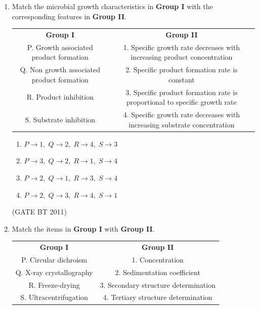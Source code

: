 \documentclass[journal,12pt,onecolumn]{IEEEtran}
\begin{document}
\begin{enumerate}
  \item Match the microbial growth characteristics in \textbf{Group I} 
  with the corresponding features in \textbf{Group II}. 

  \begin{table}[H]
  \centering
\begin{tabular}{cc}
    \textbf{Group I}  & \textbf{Group II}  \\
    P. Growth associated product formation & 1. Specific growth rate decreases with increasing product concentration \\ 
    Q. Non growth associated product formation & 2. Specific product formation rate is constant \\ 
    R. Product inhibition & 3. Specific product formation rate is proportional to specific growth rate \\ 
    S. Substrate inhibition & 4. Specific growth rate decreases with increasing substrate concentration \\
  \end{tabular}
  \end{table}

  \begin{multicols}{2}
  \begin{enumerate}
    \item $P \to 1,\; Q \to 2,\; R \to 4,\; S \to 3$
    \item $P \to 3,\; Q \to 2,\; R \to 1,\; S \to 4$
    \item $P \to 2,\; Q \to 1,\; R \to 3,\; S \to 4$
    \item $P \to 2,\; Q \to 3,\; R \to 4,\; S \to 1$
  \end{enumerate}
  \end{multicols}\hfill(GATE BT 2011)


  \item Match the items in \textbf{Group I} with \textbf{Group II}.
  
  \begin{table}[H]
  \centering
  \begin{tabular}{cc}
    \textbf{Group I}  & \textbf{Group II}  \\ 
    P. Circular dichroism & 1. Concentration \\ 
    Q. X-ray crystallography & 2. Sedimentation coefficient \\ 
    R. Freeze-drying & 3. Secondary structure determination \\ 
    S. Ultracentrifugation & 4. Tertiary structure determination \\
  \end{tabular}
  \end{table}


\end{enumerate}
\end{document}

